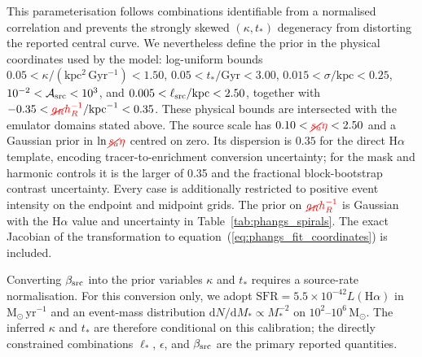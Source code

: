 \documentclass[fleqn,usenatbib]{mnras}
\newcommand{\dd}{\mathrm{d}}
\newcommand{\revaddmath}[1]{\textcolor{red}{#1}}
\newcommand{\revdelmath}[1]{\textcolor{red}{\cancel{#1}}}
\begin{document}
This parameterisation follows combinations identifiable from a normalised correlation and prevents the strongly skewed $(\kappa,t_\ast)$ degeneracy from distorting the reported central curve.  We nevertheless define the prior in the physical coordinates used by the model: log-uniform bounds $0.05<\kappa/(\mathrm{kpc^2\,Gyr^{-1}})<1.50$, $0.05<t_\ast/\mathrm{Gyr}<3.00$, $0.015<\sigma/\mathrm{kpc}<0.25$, $10^{-2}<{\cal A}_{\rm src}<10^3$, and $0.005<\ell_{\rm src}/\mathrm{kpc}<2.50$, together with $-0.35<\revdelmath{g_R}\revaddmath{h_R^{-1}}/\mathrm{kpc}^{-1}<0.35$.  These physical bounds are intersected with the emulator domains stated above.  The source scale has $0.10<\revdelmath{s_a}\revaddmath{\eta}<2.50$ and a Gaussian prior in $\ln \revdelmath{s_a}\revaddmath{\eta}$ centred on zero.  Its dispersion is $0.35$ for the direct H$\alpha$ template, encoding tracer-to-enrichment conversion uncertainty; for the mask and harmonic controls it is the larger of 0.35 and the fractional block-bootstrap contrast uncertainty.  Every case is additionally restricted to positive event intensity on the endpoint and midpoint grids.  The prior on $\revdelmath{g_R}\revaddmath{h_R^{-1}}$ is Gaussian with the H$\alpha$ value and uncertainty in Table~\ref{tab:phangs_spirals}.  The exact Jacobian of the transformation to equation~(\ref{eq:phangs_fit_coordinates}) is included.

Converting $\beta_{\rm src}$ into the prior variables $\kappa$ and $t_\ast$ requires a source-rate normalisation.  For this conversion only, we adopt $\mathrm{SFR}=5.5\times10^{-42}L(\mathrm{H}\alpha)$ in $\mathrm{M_\odot\,yr^{-1}}$ \citep{KennicuttEvans2012} and an event-mass distribution $\dd N/\dd M_\ast\propto M_\ast^{-2}$ on $10^2$--$10^6\,\mathrm{M_\odot}$.  The inferred $\kappa$ and $t_\ast$ are therefore conditional on this calibration; the directly constrained combinations $\ell_\ast$, $\epsilon$, and $\beta_{\rm src}$ are the primary reported quantities.
\end{document}
